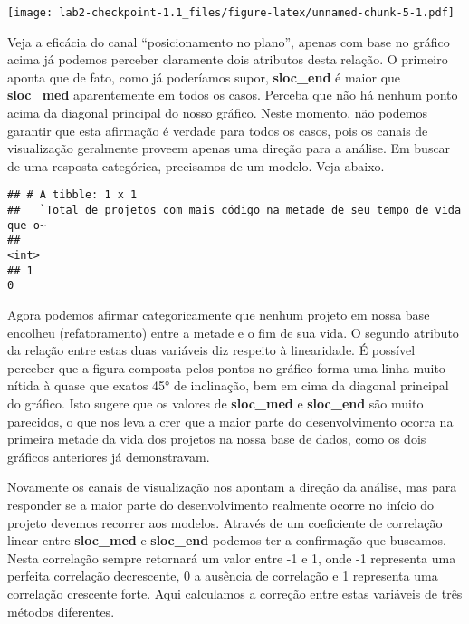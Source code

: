 \documentclass[]{article}
\newenvironment{Shaded}{\begin{snugshade}}{\end{snugshade}}
\newcommand{\KeywordTok}[1]{\textcolor[rgb]{0.13,0.29,0.53}{\textbf{#1}}}
\newcommand{\DataTypeTok}[1]{\textcolor[rgb]{0.13,0.29,0.53}{#1}}
\newcommand{\StringTok}[1]{\textcolor[rgb]{0.31,0.60,0.02}{#1}}
\newcommand{\OperatorTok}[1]{\textcolor[rgb]{0.81,0.36,0.00}{\textbf{#1}}}
\newcommand{\NormalTok}[1]{#1}
\begin{document}
\texttt{[image: lab2-checkpoint-1.1\_files/figure-latex/unnamed-chunk-5-1.pdf]}

Veja a eficácia do canal ``posicionamento no plano'', apenas com base no
gráfico acima já podemos perceber claramente dois atributos desta
relação. O primeiro aponta que de fato, como já poderíamos supor,
\textbf{sloc\_end} é maior que \textbf{sloc\_med} aparentemente em todos
os casos. Perceba que não há nenhum ponto acima da diagonal principal do
nosso gráfico. Neste momento, não podemos garantir que esta afirmação é
verdade para todos os casos, pois os canais de visualização geralmente
proveem apenas uma direção para a análise. Em buscar de uma resposta
categórica, precisamos de um modelo. Veja abaixo.

\begin{Shaded}
\end{Shaded}

\begin{verbatim}
## # A tibble: 1 x 1
##   `Total de projetos com mais código na metade de seu tempo de vida que o~
##                                                                      <int>
## 1                                                                        0
\end{verbatim}

Agora podemos afirmar categoricamente que nenhum projeto em nossa base
encolheu (refatoramento) entre a metade e o fim de sua vida. O segundo
atributo da relação entre estas duas variáveis diz respeito à
linearidade. É possível perceber que a figura composta pelos pontos no
gráfico forma uma linha muito nítida à quase que exatos 45° de
inclinação, bem em cima da diagonal principal do gráfico. Isto sugere
que os valores de \textbf{sloc\_med} e \textbf{sloc\_end} são muito
parecidos, o que nos leva a crer que a maior parte do desenvolvimento
ocorra na primeira metade da vida dos projetos na nossa base de dados,
como os dois gráficos anteriores já demonstravam.

Novamente os canais de visualização nos apontam a direção da análise,
mas para responder se a maior parte do desenvolvimento realmente ocorre
no início do projeto devemos recorrer aos modelos. Através de um
coeficiente de correlação linear entre \textbf{sloc\_med} e
\textbf{sloc\_end} podemos ter a confirmação que buscamos. Nesta
correlação sempre retornará um valor entre -1 e 1, onde -1 representa
uma perfeita correlação decrescente, 0 a ausência de correlação e 1
representa uma correlação crescente forte. Aqui calculamos a correção
entre estas variáveis de três métodos diferentes.
\end{document}
